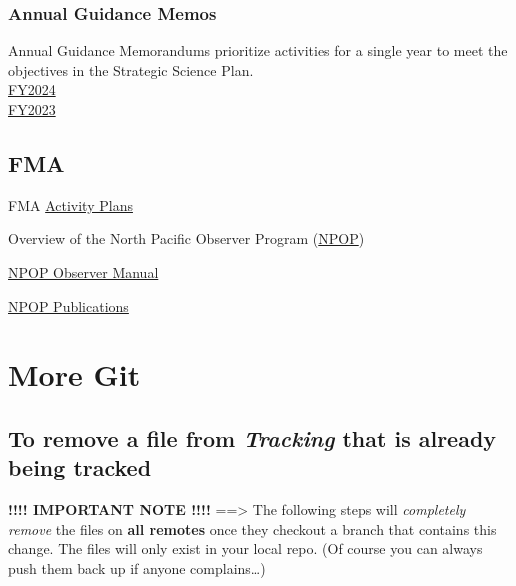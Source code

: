 \documentclass[
  letterpaper,
  DIV=11,
  numbers=noendperiod]{scrreprt}
\begin{document}
\subsection{Annual Guidance Memos}\label{annual-guidance-memos}

Annual Guidance Memorandums prioritize activities for a single year to
meet the objectives in the Strategic Science Plan.\\
\href{https://drive.google.com/file/d/1aMWiMJYuM8pueNbeHaLJoRBG6VlzTFYP/view}{FY2024}\\
\href{https://drive.google.com/file/d/1EuLPPk031l8KWI1bVu-W0F3H9waHoRK4/view}{FY2023}

\section{FMA}\label{fma}

FMA
\href{https://drive.google.com/drive/folders/1LzUtltFG2Z-vLy5vbFF0dkA6B4bQOHh9}{Activity
Plans}

Overview of the North Pacific Observer Program
(\href{https://www.fisheries.noaa.gov/alaska/fisheries-observers/north-pacific-observer-program}{NPOP})

\href{https://www.fisheries.noaa.gov/resource/document/north-pacific-observer-sampling-manual}{NPOP
Observer Manual}

\href{https://www.fisheries.noaa.gov/resource/document/north-pacific-observer-program-publications}{NPOP
Publications}

\chapter{More Git}\label{more-git}

\section{\texorpdfstring{To remove a file from \emph{Tracking} that is
already being
tracked}{To remove a file from Tracking that is already being tracked}}\label{to-remove-a-file-from-tracking-that-is-already-being-tracked}

\textbf{!!!! IMPORTANT NOTE !!!!} ==\textgreater{} The following steps
will \emph{completely remove} the files on \textbf{all remotes} once
they checkout a branch that contains this change. The files will only
exist in your local repo. (Of course you can always push them back up if
anyone complains\ldots)
\end{document}
